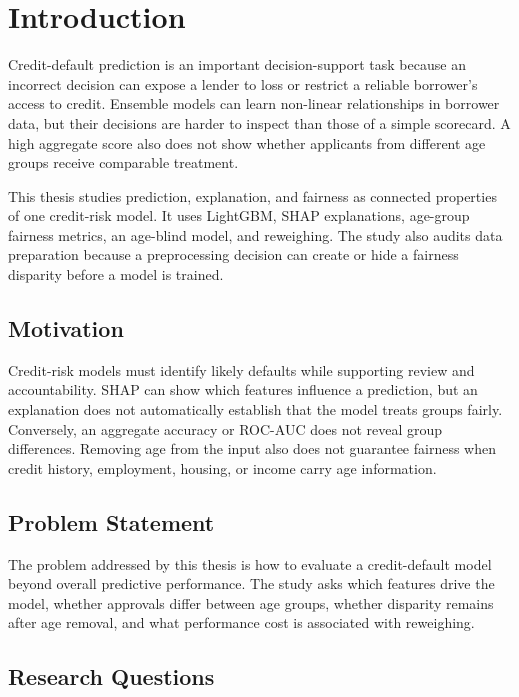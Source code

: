 \chapter{Introduction}
\label{chap:introduction}

Credit-default prediction is an important decision-support task because an
incorrect decision can expose a lender to loss or restrict a reliable
borrower's access to credit. Ensemble models can learn non-linear relationships
in borrower data, but their decisions are harder to inspect than those of a
simple scorecard. A high aggregate score also does not show whether applicants
from different age groups receive comparable treatment.

This thesis studies prediction, explanation, and fairness as connected
properties of one credit-risk model. It uses LightGBM, SHAP explanations,
age-group fairness metrics, an age-blind model, and reweighing. The study also
audits data preparation because a preprocessing decision can create or hide a
fairness disparity before a model is trained.

\section{Motivation}

Credit-risk models must identify likely defaults while supporting review and
accountability. SHAP can show which features influence a prediction, but an
explanation does not automatically establish that the model treats groups
fairly. Conversely, an aggregate accuracy or ROC-AUC does not reveal group
differences. Removing age from the input also does not guarantee fairness when
credit history, employment, housing, or income carry age information.

\section{Problem Statement}

The problem addressed by this thesis is how to evaluate a credit-default model
beyond overall predictive performance. The study asks which features drive
the model, whether approvals differ between age groups, whether disparity
remains after age removal, and what performance cost is associated with
reweighing.

\section{Research Questions}
\label{sec:research-questions}

